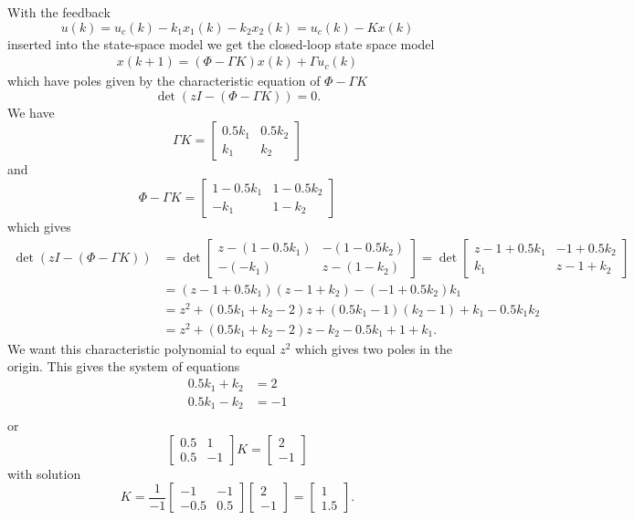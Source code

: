\documentclass[letter,12pt]{article}
\newcommand{\bbm}{\begin{bmatrix}}
\newcommand{\ebm}{\end{bmatrix}}
\begin{document}
With the feedback \[u(k) = u_c(k) - k_1 x_1(k) - k_2 x_2(k) = u_c(k) - Kx(k) \]
inserted into the state-space model we get the closed-loop state space model
\begin{equation*}
\begin{split}
x(k+1) = \left(\Phi - \Gamma K\right)x(k) + \Gamma u_c(k)
\end{split}
\end{equation*}
which have poles given by the characteristic equation of $\Phi - \Gamma K$
\[ \det \left(zI - (\Phi - \Gamma K)\right) = 0. \] We have
\[ \Gamma K = \bbm 0.5 k_1 & 0.5 k_2\\ k_1 & k_2 \ebm \] and
\[ \Phi - \Gamma K = \bbm 1 - 0.5k_1 & 1-0.5k_2\\-k_1 & 1 - k_2 \ebm \] which gives
\begin{equation*}
\begin{split}
\det \left(zI - (\Phi - \Gamma K)\right)  &= \det \bbm z - (1 - 0.5k_1) & -(1-0.5k_2)\\-(-k_1) & z-(1 - k_2) \ebm  = \det \bbm z - 1 + 0.5k_1 & -1+0.5k_2\\k_1 & z- 1 + k_2 \ebm\\
  &= (z - 1 + 0.5k_1)(z- 1 + k_2) - (-1+0.5k_2)k_1\\
  &= z^2 + (0.5k_1 +k_2 - 2)z + (0.5k_1-1)(k_2-1) + k_1 - 0.5k_1k_2\\
  &= z^2 + (0.5k_1 + k_2 - 2)z -k_2 -0.5k_1 + 1 + k_1.
\end{split}
\end{equation*}
We want this characteristic polynomial to equal \(z^2\) which gives two poles in the origin. This gives the system of equations
\begin{align*}
0.5k_1 + k_2 &= 2\\
0.5k_1 - k_2 &= -1\\
\end{align*}
or
\[ \bbm 0.5 & 1\\0.5 & -1\ebm K = \bbm 2\\-1\ebm \]
with solution 
\[ K = \frac{1}{-1} \bbm -1 & -1\\-0.5 & 0.5 \ebm \bbm 2\\-1\ebm = \bbm 1\\1.5 \ebm. \]
\end{document}

